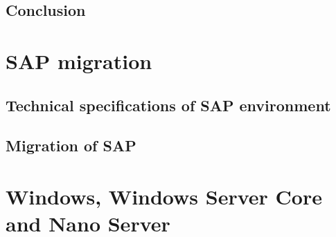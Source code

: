 \subsection{Conclusion}
\section{SAP migration}
\subsection{Technical specifications of SAP environment}
\subsection{Migration of SAP}
\section{Windows, Windows Server Core and Nano Server}